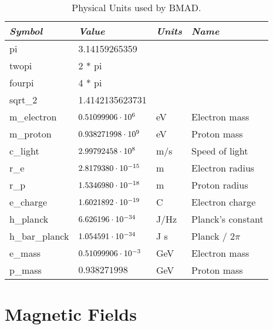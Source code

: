 \begin{table}
\centering
\begin{tabular}{|l|l|l|l|} \hline
  {\em Symbol}   & {\em Value}       & {\em Units} &  {\em Name}     \\ \hline
  pi             & 3.14159265359          &        &                   \\
  twopi          & 2 * pi                 &        &                   \\
  fourpi         & 4 * pi                 &        &                   \\
  sqrt\_2        & 1.4142135623731        &        &                   \\
  m\_electron    & $0.51099906 \cdot 10^{6}$   & eV     & Electron mass     \\
  m\_proton      & $0.938271998 \cdot 10^{9}$  & eV     & Proton mass       \\
  c\_light       & $2.99792458 \cdot 10^{8}$   & m/s    & Speed of light    \\
  r\_e           & $2.8179380 \cdot 10^{-15}$  & m      & Electron radius   \\
  r\_p           & $1.5346980 \cdot 10^{-18}$  & m      & Proton radius     \\
  e\_charge      & $1.6021892 \cdot 10^{-19}$  & C      & Electron charge   \\
  h\_planck      & $6.626196 \cdot 10^{-34}$   & J/Hz   & Planck's constant \\
  h\_bar\_planck & $1.054591 \cdot 10^{-34}$   & J s    & Planck / $2\pi$   \\
  e\_mass        & $0.51099906 \cdot 10^{-3}$  & GeV    & Electron mass     \\
  p\_mass        & $0.938271998$          & GeV    & Proton mass     \\ \hline
\end{tabular}
\caption{Physical Units used by BMAD.}
\label{t:constants}
\end{table}


\section{Magnetic Fields}

